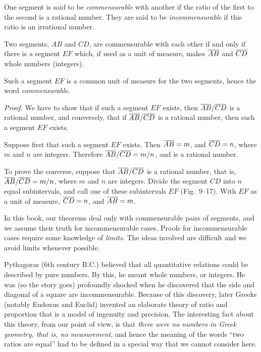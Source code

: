\documentclass[11pt]{book}
\begin{document}
\begin{definition}
One segment is said to be \emph{commensurable} with another if the ratio of the
first to the second is a rational number. They are said to be
\emph{incommensurable} if this ratio is an irrational number.
\end{definition}

\begin{theorem}
Two segments, $AB$ and $CD$, are commensurable with each other if and only if
there is a segment $EF$ which, if used as a unit of measure, makes $\overline{AB}$ and
$\overline{CD}$ whole numbers (integers).
\end{theorem}

\begin{remark}
Such a segment $EF$ is a common unit of measure for the two segments, hence the
word \emph{commensurable}.
\end{remark}

\noindent\emph{Proof.} We have to show that if such a segment $EF$ exists, then
$\overline{AB}/\overline{CD}$ is a rational number, and conversely, that if
$\overline{AB}/\overline{CD}$ is a rational number, then such a segment $EF$ exists.

Suppose first that such a segment $EF$ exists. Then $\overline{AB} = m$, and
$\overline{CD} = n$, where $m$ and $n$ are integers. Therefore $\overline{AB}/\overline{CD} = m/n$,
and is a rational number.

To prove the converse, suppose that $\overline{AB}/\overline{CD}$ is a rational number, that
is, $\overline{AB}/\overline{CD} = m/n$, where $m$ and $n$ are integers. Divide the segment
$CD$ into $n$ equal subintervals, and call one of these subintervals $EF$
(Fig.~9--17). With $EF$ as a unit of measure, $\overline{CD} = n$, and $\overline{AB} = m$.

\FIGIXSEVENTEEN

\begin{note}
In this book, our theorems deal only with commensurable pairs of segments, and we
assume their truth for incommensurable cases. Proofs for incommensurable cases
require some knowledge of \emph{limits}. The ideas involved are difficult and we
avoid limits whenever possible.
\end{note}

\begin{histremark}
Pythagoras (6th century B.C.) believed that all quantitative relations could be
described by pure numbers. By this, he meant whole numbers, or integers. He was
(so the story goes) profoundly shocked when he discovered that the side and
diagonal of a square are incommensurable. Because of this discovery, later Greeks
(notably Eudoxus and Euclid) invented an elaborate theory of ratio and
proportion that is a model of ingenuity and precision. The interesting fact
about this theory, from our point of view, is
that \emph{there were no numbers in Greek geometry, that is, no measurement}, and
hence the meaning of the words ``two ratios are equal'' had to be defined in a
special way that we cannot consider here.
\end{histremark}
\end{document}
